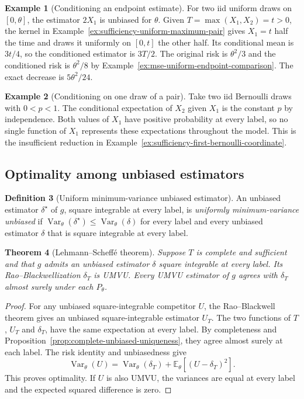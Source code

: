 \documentclass[11pt,oneside]{book}
\newtheorem{theorem}{Theorem}[chapter]
\theoremstyle{definition}
\newtheorem{definition}[theorem]{Definition}
\newtheorem{example}[theorem]{Example}
\theoremstyle{remark}
\begin{document}
\begin{example}[Conditioning an endpoint estimate]
\label{ex:rao-blackwell-uniform-two-draws}
For two iid uniform draws on $[0,\theta]$, the estimator $2X_1$
is unbiased for $\theta$. Given $T=\max(X_1,X_2)=t>0$, the kernel
in Example~\ref{ex:sufficiency-uniform-maximum-pair} gives $X_1=t$
half the time and draws it uniformly on $[0,t]$ the other half.
Its conditional mean is $3t/4$, so the conditioned estimator is
$3T/2$. The original risk is $\theta^2/3$ and the conditioned
risk is $\theta^2/8$ by Example~\ref{ex:mse-uniform-endpoint-comparison}.
The exact decrease is $5\theta^2/24$.
\end{example}

\begin{example}[Conditioning on one draw of a pair]
\label{ex:rao-blackwell-insufficient-bernoulli}
Take two iid Bernoulli draws with $0<p<1$. The conditional
expectation of $X_2$ given $X_1$ is the constant $p$ by independence.
Both values of $X_1$ have positive probability at every label,
so no single function of $X_1$ represents these expectations
throughout the model. This is the insufficient reduction in
Example~\ref{ex:sufficiency-first-bernoulli-coordinate}.
\end{example}

\subsection{Optimality among unbiased estimators}
\label{subsec:lehmann-scheffe}

\begin{definition}[Uniform minimum-variance unbiased estimator]
\label{def:umvu-estimator}
An unbiased estimator $\delta^\star$ of $g$, square integrable
at every label, is \emph{uniformly minimum-variance unbiased}
if $\operatorname{Var}_\theta(\delta^\star)\leq
\operatorname{Var}_\theta(\delta)$ for every label and every
unbiased estimator $\delta$ that is square integrable at every label.
\end{definition}

\begin{theorem}[Lehmann--Scheff\'e theorem]
\label{thm:lehmann-scheffe}
Suppose $T$ is complete and sufficient and that $g$ admits an
unbiased estimator $\delta$ square integrable at every label.
Its Rao--Blackwellization $\delta_T$ is UMVU. Every UMVU estimator
of $g$ agrees with $\delta_T$ almost surely under each $P_\theta$.
\end{theorem}
\begin{proof}
For any unbiased square-integrable competitor $U$, the Rao--Blackwell
theorem gives an unbiased square-integrable estimator $U_T$.
The two functions of $T$, $U_T$ and $\delta_T$, have the same
expectation at every label. By completeness and
Proposition~\ref{prop:complete-unbiased-uniqueness}, they agree
almost surely at each label. The risk identity and unbiasedness give
\[
\operatorname{Var}_\theta(U)
=\operatorname{Var}_\theta(\delta_T)
 +\mathbb E_\theta[(U-\delta_T)^2].
\]
This proves optimality. If $U$ is also UMVU, the variances are equal
at every label and the expected squared difference is zero.
\end{proof}
\end{document}
